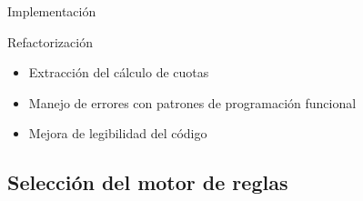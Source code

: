 \documentclass[10pt]{beamer}
\begin{document}
\begin{frame}{Implementación}
    \begin{block}{Refactorización}
        \begin{itemize}
            \item Extracción del cálculo de cuotas
            \item Manejo de errores con patrones de programación funcional
            \item Mejora de legibilidad del código
        \end{itemize}
    \end{block}
\end{frame}

\subsection{Selección del motor de reglas}
\end{document}
